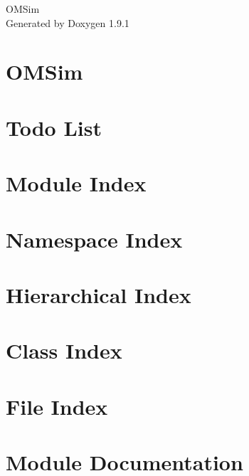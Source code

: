 \let\mypdfximage\pdfximage\def\pdfximage{\immediate\mypdfximage}\documentclass[twoside]{book}
\newcommand{\+}{\discretionary{\mbox{\scriptsize$\hookleftarrow$}}{}{}}
\newcommand{\clearemptydoublepage}{%
  \newpage{\pagestyle{empty}\cleardoublepage}%
}
\begin{document}
\raggedbottom

\hypersetup{pageanchor=false,
             bookmarksnumbered=true,
             pdfencoding=unicode
            }
\begin{titlepage}
\vspace*{7cm}
\begin{center}%
{\Large OMSim }\\
\vspace*{1cm}
{\large Generated by Doxygen 1.9.1}\\
\end{center}
\end{titlepage}
\clearemptydoublepage
{}
\tableofcontents
\clearemptydoublepage
{}
\hypersetup{pageanchor=true}

\chapter{OMSim}
\label{index}\hypertarget{index}{}
\chapter{Todo List}
\label{todo}

\chapter{Module Index}

\chapter{Namespace Index}

\chapter{Hierarchical Index}

\chapter{Class Index}

\chapter{File Index}

\chapter{Module Documentation}





\end{document}
